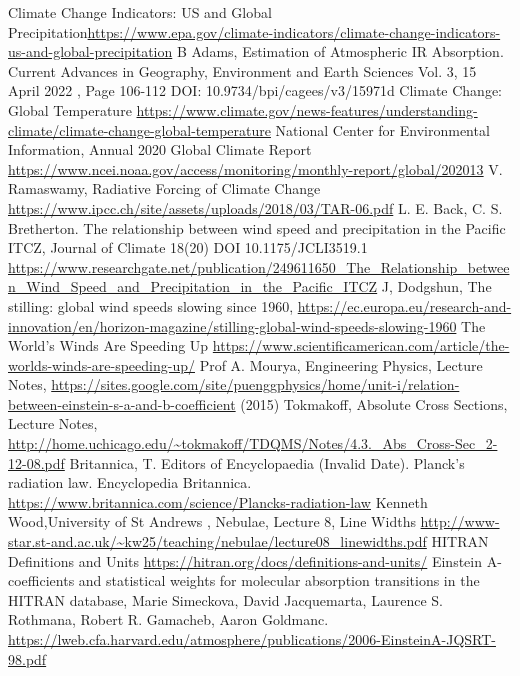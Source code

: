 \documentclass{book}
\begin{document}
	\begin{thebibliography}{99}
		 Climate Change Indicators: US and Global Precipitation\url{https://www.epa.gov/climate-indicators/climate-change-indicators-us-and-global-precipitation}
	     B Adams, Estimation of Atmospheric IR Absorption. Current Advances in Geography, Environment and Earth Sciences Vol. 3, 15 April 2022 , Page 106-112  DOI: 10.9734/bpi/cagees/v3/15971d
	     Climate Change: Global Temperature \url{https://www.climate.gov/news-features/understanding-climate/climate-change-global-temperature}
	     National Center for Environmental Information,  Annual 2020 Global Climate Report \url{https://www.ncei.noaa.gov/access/monitoring/monthly-report/global/202013}
	     V. Ramaswamy, Radiative Forcing of Climate Change \url{https://www.ipcc.ch/site/assets/uploads/2018/03/TAR-06.pdf}
	     L. E. Back, C. S. Bretherton. The relationship between wind speed and precipitation in the Pacific ITCZ, Journal of Climate 18(20) DOI 10.1175/JCLI3519.1 \url{https://www.researchgate.net/publication/249611650_The_Relationship_between_Wind_Speed_and_Precipitation_in_the_Pacific_ITCZ}
	     J, Dodgshun, The stilling: global wind speeds slowing since 1960, \url{https://ec.europa.eu/research-and-innovation/en/horizon-magazine/stilling-global-wind-speeds-slowing-1960}
	     The World’s Winds Are Speeding Up \url{https://www.scientificamerican.com/article/the-worlds-winds-are-speeding-up/}
		 Prof A. Mourya, Engineering Physics, Lecture Notes, \url{https://sites.google.com/site/puenggphysics/home/unit-i/relation-between-einstein-s-a-and-b-coefficient} (2015)
		 Tokmakoff, Absolute Cross Sections, Lecture Notes, \url{http://home.uchicago.edu/~tokmakoff/TDQMS/Notes/4.3._Abs_Cross-Sec_2-12-08.pdf}
		 Britannica, T. Editors of Encyclopaedia (Invalid Date). Planck's radiation law. Encyclopedia Britannica. \url{https://www.britannica.com/science/Plancks-radiation-law}
		 Kenneth Wood,University of St Andrews , Nebulae, Lecture 8, Line Widths \url{http://www-star.st-and.ac.uk/~kw25/teaching/nebulae/lecture08_linewidths.pdf}
		 HITRAN Definitions and Units \url{https://hitran.org/docs/definitions-and-units/}
		 Einstein A-coefficients and statistical weights for molecular
		absorption transitions in the HITRAN database, Marie Simeckova, David Jacquemarta, Laurence S. Rothmana,
		Robert R. Gamacheb, Aaron Goldmanc. \url{https://lweb.cfa.harvard.edu/atmosphere/publications/2006-EinsteinA-JQSRT-98.pdf}

\end{thebibliography}
\end{document}
